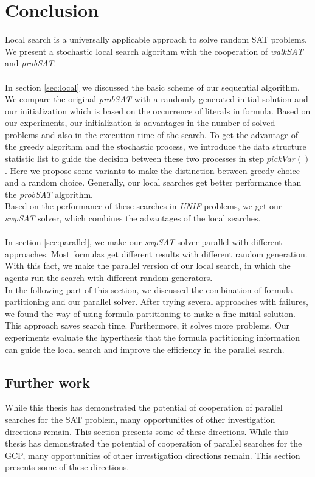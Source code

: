 \documentclass[12pt,a4paper,twoside]{scrartcl}
\numberwithin{equation}{section}
\begin{document}
\section{Conclusion}

\label{sec:conc}
Local search is a universally applicable approach to solve random SAT problems. We present a stochastic local search algorithm with the cooperation of \emph{walkSAT} and \emph{probSAT}.\\
\\
In section \ref{sec:local} we discussed the basic scheme of our sequential algorithm. We compare the original \emph{probSAT} with a randomly generated initial solution and our initialization which is based on the occurrence of literals in formula. Based on our experiments, our initialization is advantages in the number of solved problems and also in the execution time of the search. To get the advantage of the greedy algorithm and the stochastic process, we introduce the data structure statistic list to guide the decision between these two processes in step $pickVar()$. Here we propose some variants to make the distinction between greedy choice and a random choice. Generally, our local searches get better performance than the \emph{probSAT} algorithm. \\
Based on the performance of these searches in \emph{UNIF} problems, we get our \emph{swpSAT} solver, which combines the advantages of the local searches. \\
\\
In section \ref{sec:parallel}, we make our \emph{swpSAT} solver parallel with different approaches. Most formulas get different results with different random generation. With this fact, we make the parallel version of our local search, in which the agents run the search with different random generators.\\
In the following part of this section, we discussed the combination of formula partitioning and our parallel solver. After trying several approaches with failures, we found the way of using formula partitioning to make a fine initial solution. This approach saves search time.  Furthermore, it solves more problems. Our experiments evaluate the hyperthesis that the formula partitioning information can guide the local search and improve the efficiency in the parallel search.
\subsection{Further work}
While this thesis has demonstrated the potential of cooperation of parallel searches for the
SAT problem, many opportunities of other investigation directions remain. This section presents some of these directions.
While this thesis has demonstrated the potential of cooperation of parallel searches for the GCP, many opportunities of other investigation directions remain. This section presents some of these directions.\\
\end{document}
